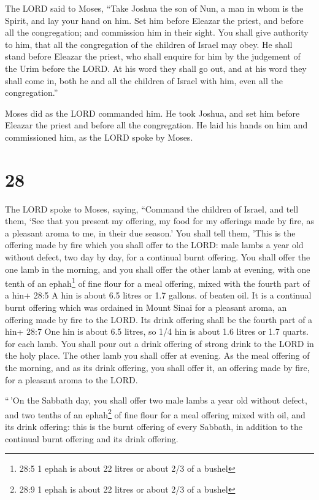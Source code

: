  The LORD said to Moses, ``Take Joshua the son of Nun, a
man in whom is the Spirit, and lay your hand on him.  Set
him before Eleazar the priest, and before all the congregation; and
commission him in their sight.  You shall give authority to
him, that all the congregation of the children of Israel may obey.
 He shall stand before Eleazar the priest, who shall
enquire for him by the judgement of the Urim before the LORD. At his
word they shall go out, and at his word they shall come in, both he and
all the children of Israel with him, even all the congregation.''

 Moses did as the LORD commanded him. He took Joshua, and
set him before Eleazar the priest and before all the congregation.
 He laid his hands on him and commissioned him, as the LORD
spoke by Moses.

\hypertarget{section-27}{%
\section{28}\label{section-27}}

 The LORD spoke to Moses, saying,  ``Command the
children of Israel, and tell them, `See that you present my offering, my
food for my offerings made by fire, as a pleasant aroma to me, in their
due season.'  You shall tell them, 'This is the offering
made by fire which you shall offer to the LORD: male lambs a year old
without defect, two day by day, for a continual burnt offering.
 You shall offer the one lamb in the morning, and you shall
offer the other lamb at evening,  with one tenth of an
ephah\footnote{28:5 1 ephah is about 22 litres or about 2/3 of a bushel}
of fine flour for a meal offering, mixed with the fourth part of a hin+
28:5 A hin is about 6.5 litres or 1.7 gallons. of beaten oil.
 It is a continual burnt offering which was ordained in
Mount Sinai for a pleasant aroma, an offering made by fire to the LORD.
 Its drink offering shall be the fourth part of a hin+ 28:7
One hin is about 6.5 litres, so 1/4 hin is about 1.6 litres or 1.7
quarts. for each lamb. You shall pour out a drink offering of strong
drink to the LORD in the holy place.  The other lamb you
shall offer at evening. As the meal offering of the morning, and as its
drink offering, you shall offer it, an offering made by fire, for a
pleasant aroma to the LORD.

 ``\,'On the Sabbath day, you shall offer two male lambs a
year old without defect, and two tenths of an ephah\footnote{28:9 1
  ephah is about 22 litres or about 2/3 of a bushel} of fine flour for a
meal offering mixed with oil, and its drink offering:  this
is the burnt offering of every Sabbath, in addition to the continual
burnt offering and its drink offering.

